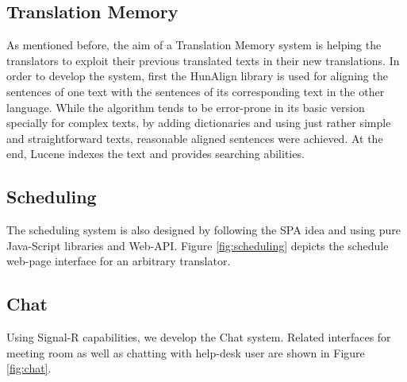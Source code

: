 \subsection{Translation Memory}
As mentioned before, the aim of a Translation Memory system is helping the translators to exploit their previous translated texts in their new translations. In order to develop the system, first the HunAlign library is used for aligning the sentences of one text with the sentences of its corresponding text in the other language. While the algorithm tends to be error-prone in its basic version specially for complex texts, by adding dictionaries and using just rather simple and straightforward texts, reasonable aligned sentences were achieved. At the end, Lucene indexes the text and provides searching abilities.

\subsection{Scheduling}
The scheduling system is also designed by following the SPA idea and using pure Java-Script libraries and Web-API. Figure \ref{fig:scheduling} depicts the schedule web-page interface for an arbitrary translator.

\subsection{Chat}
Using Signal-R capabilities, we develop the Chat system. Related interfaces for meeting room as well as chatting with help-desk user are shown in Figure \ref{fig:chat}.


